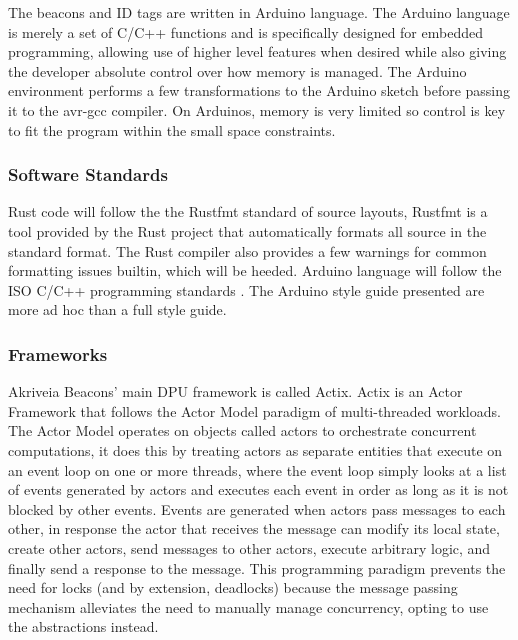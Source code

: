 \bigskip
The beacons and ID tags are written in Arduino language.
The Arduino language is merely a set of C/C++ functions and is specifically designed for embedded programming, allowing use of higher level features when desired while also giving the developer absolute control over how memory is managed.
The Arduino environment performs a few transformations to the Arduino sketch before passing it to the avr-gcc compiler.
On Arduinos, memory is very limited so control is key to fit the program within the small space constraints.


\medskip
\subsubsection{Software Standards}
\medskip
Rust code will follow the the Rustfmt standard of source layouts, Rustfmt is a tool provided by the Rust project that automatically formats all source in the standard format.
The Rust compiler also provides a few warnings for common formatting issues builtin, which will be heeded.
Arduino language will follow the ISO C/C++ programming standards \cite{cpp_core_guidelines}.
The Arduino style guide \cite{arduino_style_guide} presented are more ad hoc than a full style guide.

\medskip
\subsubsection{Frameworks}
\medskip
Akriveia Beacons' main DPU framework is called \Gls{Actix}.
Actix is an \Gls{Actor} Framework that follows the \Gls{Actor Model} paradigm of multi-threaded workloads.
The Actor Model operates on objects called actors to orchestrate concurrent computations, it does this by treating actors as separate entities that execute on an event loop on one or more threads, where the event loop simply looks at a list of events generated by actors and executes each event in order as long as it is not blocked by other events.
Events are generated when actors pass messages to each other, in response the actor that receives the message can modify its local state, create other actors, send messages to other actors, execute arbitrary logic, and finally send a response to the message.
This programming paradigm prevents the need for locks (and by extension, deadlocks) because the message passing mechanism alleviates the need to manually manage concurrency, opting to use the abstractions instead. 


